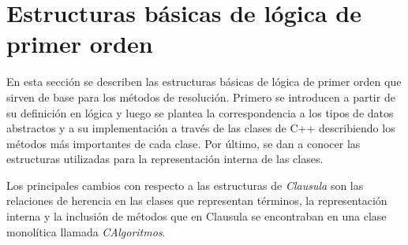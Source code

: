 \documentclass[a4paper,12pt]{article}
\begin{document}
\section{Estructuras básicas de lógica de primer orden}
En esta sección se describen las estructuras básicas de lógica de primer orden que sirven de base para los métodos de resolución.
Primero se introducen a partir de su definición en lógica y luego se plantea la correspondencia a los tipos de datos abstractos
y a su implementación a través de las clases de C++ describiendo los métodos más importantes de cada clase. 
Por último, se dan a conocer las estructuras utilizadas para la representación interna de las clases.

Los principales cambios con respecto a las estructuras de \emph{Clausula} son las relaciones de herencia
en las clases que representan términos, la representación interna y la inclusión de métodos que en Clausula
se encontraban en una clase monolítica llamada \emph{CAlgoritmos}.
\end{document}
